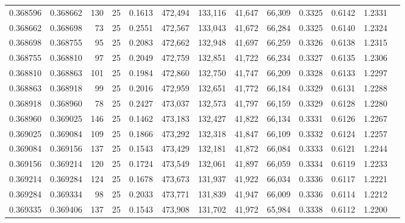 \begin{tabular}{rrrrrrrrrrrrr}
0.368596 & 0.368662 &   130 &  25 &                                     0.1613 & 472,494 & 133,116 &  41,647 &  66,309 & 0.3325 & 0.6142 & 1.2331 \\
0.368662 & 0.368698 &    73 &  25 &                                     0.2551 & 472,567 & 133,043 &  41,672 &  66,284 & 0.3325 & 0.6140 & 1.2324 \\
0.368698 & 0.368755 &    95 &  25 &                                     0.2083 & 472,662 & 132,948 &  41,697 &  66,259 & 0.3326 & 0.6138 & 1.2315 \\
0.368755 & 0.368810 &    97 &  25 &                                     0.2049 & 472,759 & 132,851 &  41,722 &  66,234 & 0.3327 & 0.6135 & 1.2306 \\
0.368810 & 0.368863 &   101 &  25 &                                     0.1984 & 472,860 & 132,750 &  41,747 &  66,209 & 0.3328 & 0.6133 & 1.2297 \\
0.368863 & 0.368918 &    99 &  25 &                                     0.2016 & 472,959 & 132,651 &  41,772 &  66,184 & 0.3329 & 0.6131 & 1.2288 \\
0.368918 & 0.368960 &    78 &  25 &                                     0.2427 & 473,037 & 132,573 &  41,797 &  66,159 & 0.3329 & 0.6128 & 1.2280 \\
0.368960 & 0.369025 &   146 &  25 &                                     0.1462 & 473,183 & 132,427 &  41,822 &  66,134 & 0.3331 & 0.6126 & 1.2267 \\
0.369025 & 0.369084 &   109 &  25 &                                     0.1866 & 473,292 & 132,318 &  41,847 &  66,109 & 0.3332 & 0.6124 & 1.2257 \\
0.369084 & 0.369156 &   137 &  25 &                                     0.1543 & 473,429 & 132,181 &  41,872 &  66,084 & 0.3333 & 0.6121 & 1.2244 \\
0.369156 & 0.369214 &   120 &  25 &                                     0.1724 & 473,549 & 132,061 &  41,897 &  66,059 & 0.3334 & 0.6119 & 1.2233 \\
0.369214 & 0.369284 &   124 &  25 &                                     0.1678 & 473,673 & 131,937 &  41,922 &  66,034 & 0.3336 & 0.6117 & 1.2221 \\
0.369284 & 0.369334 &    98 &  25 &                                     0.2033 & 473,771 & 131,839 &  41,947 &  66,009 & 0.3336 & 0.6114 & 1.2212 \\
0.369335 & 0.369406 &   137 &  25 &                                     0.1543 & 473,908 & 131,702 &  41,972 &  65,984 & 0.3338 & 0.6112 & 1.2200 \\

\end{tabular}

